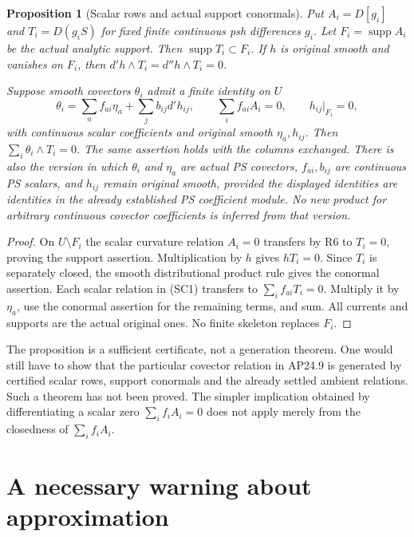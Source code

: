 \documentclass[11pt]{article}
\newtheorem{proposition}[theorem]{Proposition}
\theoremstyle{remark}\newtheorem{remark}[theorem]{Remark}
\newcommand{\supp}{\operatorname{supp}}
\begin{document}
\begin{proposition}[Scalar rows and actual support conormals]\label{prop:conormal}
Put $A_i=D[g_i]$ and $T_i=D(g_iS)$ for fixed finite continuous psh
differences $g_i$. Let $F_i=\supp A_i$ be the actual analytic support.
Then $\supp T_i\subset F_i$. If $h$ is original smooth and vanishes
on $F_i$, then $d'h\wedge T_i=d''h\wedge T_i=0$.

Suppose smooth covectors $\theta_i$ admit a finite identity on $U$
\[
 \theta_i=\sum_a f_{ai}\eta_a+\sum_j b_{ij}d'h_{ij},
 \qquad \sum_i f_{ai}A_i=0,
 \qquad h_{ij}|_{F_i}=0,                               \tag{SC1}
\]
with continuous scalar coefficients and original smooth $\eta_a,h_{ij}$.
Then $\sum_i\theta_i\wedge T_i=0$. The same assertion holds with
the columns exchanged. There is also the version in which $\theta_i$
and $\eta_a$ are actual PS covectors, $f_{ai},b_{ij}$ are continuous PS
scalars, and $h_{ij}$ remain original smooth, provided the displayed
identities are identities in the already established PS coefficient
module. No new product for arbitrary continuous covector coefficients
is inferred from that version.
\end{proposition}
\begin{proof}
On $U\setminus F_i$ the scalar curvature relation $A_i=0$ transfers
by R6 to $T_i=0$, proving the support assertion. Multiplication by $h$
gives $hT_i=0$. Since $T_i$ is separately closed, the smooth distributional
product rule gives the conormal assertion. Each scalar relation in (SC1)
transfers to $\sum_i f_{ai}T_i=0$. Multiply it by $\eta_a$, use the
conormal assertion for the remaining terms, and sum. All currents and
supports are the actual original ones. No finite skeleton replaces $F_i$.
\end{proof}

The proposition is a sufficient certificate, not a generation theorem.
One would still have to show that the particular covector relation in
AP24.9 is generated by certified scalar rows, support conormals and the
already settled ambient relations. Such a theorem has not been proved.
The simpler implication obtained by differentiating a scalar zero
$\sum_i f_iA_i=0$ does not apply merely from the closedness of
$\sum_i f_iA_i$.

\section{A necessary warning about approximation}
\end{document}

